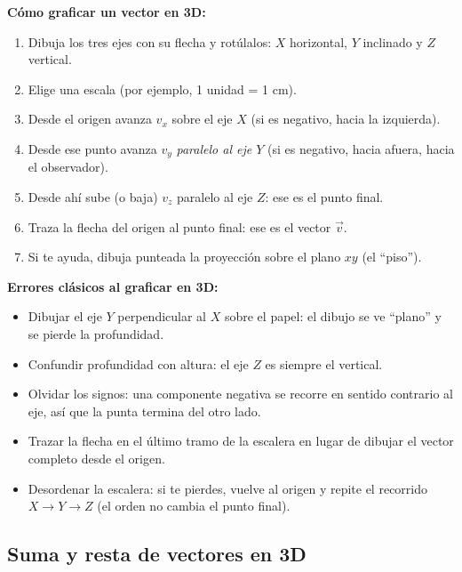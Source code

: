 \documentclass[12pt, letterpaper]{article}
\begin{document}
\begin{cuadropasos}
  \textbf{Cómo graficar un vector en 3D:}
  \begin{enumerate}[leftmargin=*]
    \item Dibuja los tres ejes con su flecha y rotúlalos: $X$ horizontal, $Y$ inclinado y $Z$ vertical.
    \item Elige una escala (por ejemplo, 1 unidad = 1 cm).
    \item Desde el origen avanza $v_x$ sobre el eje $X$ (si es negativo, hacia la izquierda).
    \item Desde ese punto avanza $v_y$ \emph{paralelo al eje $Y$} (si es negativo, hacia afuera, hacia el observador).
    \item Desde ahí sube (o baja) $v_z$ paralelo al eje $Z$: ese es el punto final.
    \item Traza la flecha del origen al punto final: ese es el vector $\vec{v}$.
    \item Si te ayuda, dibuja punteada la proyección sobre el plano $xy$ (el ``piso'').
  \end{enumerate}
\end{cuadropasos}

\begin{cuadroadvertencia}
  \textbf{Errores clásicos al graficar en 3D:}
  \begin{itemize}[leftmargin=*]
    \item Dibujar el eje $Y$ perpendicular al $X$ sobre el papel: el dibujo se ve ``plano'' y se pierde la profundidad.
    \item Confundir profundidad con altura: el eje $Z$ es siempre el vertical.
    \item Olvidar los signos: una componente negativa se recorre en sentido contrario al eje, así que la punta termina del otro lado.
    \item Trazar la flecha en el último tramo de la escalera en lugar de dibujar el vector completo desde el origen.
    \item Desordenar la escalera: si te pierdes, vuelve al origen y repite el recorrido $X \to Y \to Z$ (el orden no cambia el punto final).
  \end{itemize}
\end{cuadroadvertencia}

\subsection{Suma y resta de vectores en 3D}
\end{document}
